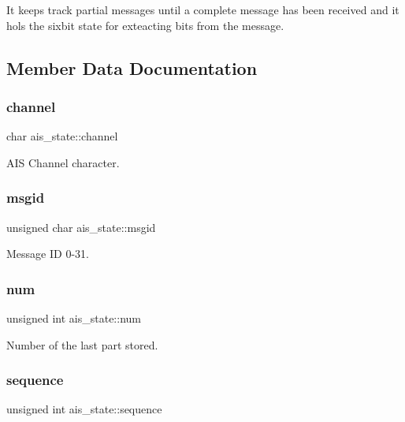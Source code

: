 It keeps track partial messages until a complete message has been received and it hols the sixbit state for exteacting bits from the message. 

\subsection{Member Data Documentation}
\mbox{\label{structais__state_a5878295f539fbcd20ae5cb12c4e2da19}} 
\subsubsection{\texorpdfstring{channel}{channel}}
{\footnotesize\ttfamily char ais\+\_\+state\+::channel}



A\+IS Channel character. 

\mbox{\label{structais__state_a60e9e905fb708ad025c8f05235ea45c0}} 
\subsubsection{\texorpdfstring{msgid}{msgid}}
{\footnotesize\ttfamily unsigned char ais\+\_\+state\+::msgid}



Message ID 0-\/31. 

\mbox{\label{structais__state_ab9e57e0fec53505653a2e6d31c5b80d8}} 
\subsubsection{\texorpdfstring{num}{num}}
{\footnotesize\ttfamily unsigned int ais\+\_\+state\+::num}



Number of the last part stored. 

\mbox{\label{structais__state_acc3dec0720044a75c7419a35ed01e903}} 
\subsubsection{\texorpdfstring{sequence}{sequence}}
{\footnotesize\ttfamily unsigned int ais\+\_\+state\+::sequence}



